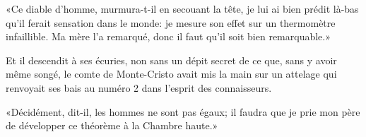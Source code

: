 «Ce diable d'homme, murmura-t-il en secouant la tête, je lui ai bien prédit là-bas qu'il ferait sensation dans le monde: je mesure son effet sur un thermomètre infaillible. Ma mère l'a remarqué, donc il faut qu'il soit bien remarquable.» 

Et il descendit à ses écuries, non sans un dépit secret de ce que, sans y avoir même songé, le comte de Monte-Cristo avait mis la main sur un attelage qui renvoyait ses bais au numéro 2 dans l'esprit des connaisseurs. 

«Décidément, dit-il, les hommes ne sont pas égaux; il faudra que je prie mon père de développer ce théorème à la Chambre haute.» 
